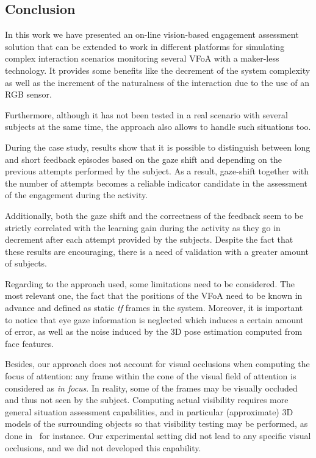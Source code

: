 \documentclass{sig-alternate}
\begin{document}

\subsection{Conclusion}

In this work we have presented an on-line vision-based engagement assessment
solution that can be extended to work in different platforms for simulating
complex interaction scenarios monitoring several VFoA with a maker-less
technology. It provides some benefits like the decrement of the system
complexity as well as the increment of the naturalness of the interaction due to
the use of an RGB sensor.  

Furthermore, although it has not been tested in a real scenario with several
subjects at the same time, the approach also allows to handle such situations
too.

During the case study, results show that it is possible to distinguish between
long and short feedback episodes based on the gaze shift and depending on the
previous attempts performed by the subject. As a result, gaze-shift together
with the number of attempts becomes a reliable indicator candidate in the
assessment of the engagement during the activity.

Additionally, both the gaze shift and the correctness of the feedback seem to be
strictly correlated with the learning gain during the activity as they go in
decrement after each attempt provided by the subjects. Despite the fact that
these results are encouraging, there is a need of validation with a greater
amount of subjects.

Regarding to the approach used, some limitations need to be considered. The most
relevant one, the fact that the positions of the VFoA need to be known in
advance and defined as static \textit{tf} frames in the system. Moreover, it is
important to notice that eye gaze information is neglected which induces a
certain amount of error, as well as the noise induced by the 3D pose estimation
computed from face features.

Besides, our approach does not account for visual occlusions when computing the
focus of attention: any frame within the cone of the visual field of attention
is considered as \emph{in focus}. In reality, some of the frames may be visually
occluded and thus not seen by the subject. Computing actual visibility requires
more general situation assessment capabilities, and in particular (approximate)
3D models of the surrounding objects so that visibility testing may be
performed, as done in~\cite{sisbot2011situation} for instance. Our experimental
setting did not lead to any specific visual occlusions, and we did not developed
this capability.
\end{document}
